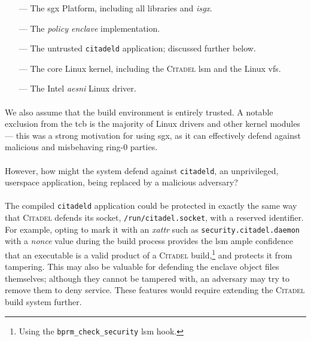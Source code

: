 \begin{itemize}
    \item[---] The \acrshort{sgx} Platform, including all libraries and \textit{isgx}. 
    \item[---] The \textit{policy enclave} implementation.
    \item[---] The untrusted \texttt{citadeld} application; discussed further below.
    \item[---] The core Linux kernel, including the \textsc{Citadel} \acrshort{lsm} and the Linux \acrshort{vfs}.   
    \item[---] The Intel \textit{\acrshort{aesni}} Linux driver. 
\end{itemize}

\paragraph{} We also assume that the build environment is entirely trusted. A notable exclusion from the \acrshort{tcb} is the majority of Linux drivers and other kernel modules --- this was a strong motivation for using \acrshort{sgx}, as it can effectively defend against malicious and misbehaving ring-0 parties. 

\paragraph{} However, how might the system defend against \texttt{citadeld}, an un\-privileged, user\-space application, being replaced by a malicious adversary?


\paragraph{} The compiled \texttt{citadeld} application could be protected in exactly the same way that \textsc{Citadel} defends its socket, \texttt{/run/citadel.socket}, with a reserved identifier. For example, opting to mark it with an \textit{\acrshort{xattr}} such as \texttt{security.citadel.daemon} with a \textit{nonce} value during the build process provides the \acrshort{lsm} ample confidence that an executable is a valid product of a \textsc{Citadel} build,\footnote{Using the \texttt{bprm\_check\_security} \acrshort{lsm} hook.} and protects it from tampering. This may also be valuable for defending the enclave object files themselves; although they cannot be tampered with, an adversary may try to remove them to deny service. These features would require extending the \textsc{Citadel} build system further.

